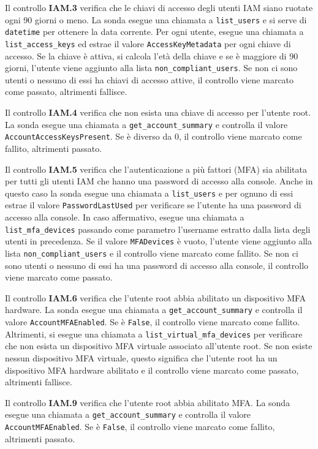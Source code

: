Il controllo \textbf{IAM.3} verifica che le chiavi di accesso degli utenti IAM siano ruotate ogni 90 giorni o meno. La sonda esegue una chiamata a \texttt{list\_users} e si serve di \texttt{datetime} per ottenere la data corrente. Per ogni utente, esegue una chiamata a \texttt{list\_access\_keys} ed estrae il valore \texttt{AccessKeyMetadata} per ogni chiave di accesso. Se la chiave è attiva, si calcola l'età della chiave e se è maggiore di 90 giorni, l'utente viene aggiunto alla lista \texttt{non\_compliant\_users}. Se non ci sono utenti o nessuno di essi ha chiavi di accesso attive, il controllo viene marcato come passato, altrimenti fallisce.

Il controllo \textbf{IAM.4} verifica che non esista una chiave di accesso per l'utente root. La sonda esegue una chiamata a \texttt{get\_account\_summary} e controlla il valore \texttt{AccountAccessKeysPresent}. Se è diverso da 0, il controllo viene marcato come fallito, altrimenti passato.

Il controllo \textbf{IAM.5} verifica che l'autenticazione a più fattori (MFA) sia abilitata per tutti gli utenti IAM che hanno una password di accesso alla console. Anche in questo caso la sonda esegue una chiamata a \texttt{list\_users} e per ognuno di essi estrae il valore \texttt{PasswordLastUsed} per verificare se l'utente ha una password di accesso alla console. In caso affermativo, esegue una chiamata a \texttt{list\_mfa\_devices} passando come parametro l'username estratto dalla lista degli utenti in precedenza. Se il valore \texttt{MFADevices} è vuoto, l'utente viene aggiunto alla lista \texttt{non\_compliant\_users} e il controllo viene marcato come fallito. Se non ci sono utenti o nessuno di essi ha una password di accesso alla console, il controllo viene marcato come passato.

Il controllo \textbf{IAM.6} verifica che l'utente root abbia abilitato un dispositivo MFA hardware. La sonda esegue una chiamata a \texttt{get\_account\_summary} e controlla il valore \texttt{AccountMFAEnabled}. Se è \texttt{False}, il controllo viene marcato come fallito. Altrimenti, si esegue una chiamata a \texttt{list\_virtual\_mfa\_devices} per verificare che non esista un dispositivo MFA virtuale associato all'utente root. Se non esiste nessun dispositivo MFA virtuale, questo significa che l'utente root ha un dispositivo MFA hardware abilitato e il controllo viene marcato come passato, altrimenti fallisce.

Il controllo \textbf{IAM.9} verifica che l'utente root abbia abilitato MFA. La sonda esegue una chiamata a \texttt{get\_account\_summary} e controlla il valore \texttt{AccountMFAEnabled}. Se è \texttt{False}, il controllo viene marcato come fallito, altrimenti passato.

